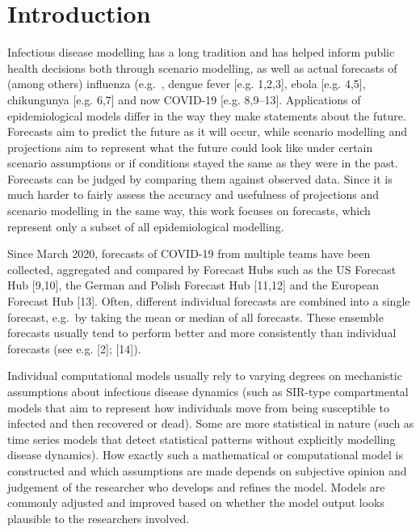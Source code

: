 \documentclass[10pt,letterpaper]{article}
\begin{document}
\linenumbers

\hypertarget{introduction}{%
\section{Introduction}\label{introduction}}

Infectious disease modelling has a long tradition and has helped inform
public health decisions both through scenario modelling, as well as
actual forecasts of (among others) influenza
(e.g.~\cite{mcgowanCollaborativeEffortsForecast2019, reichCollaborativeMultiyearMultimodel2019,  shamanForecastingSeasonalOutbreaks2012, biggerstaffResultsCentersDisease2016},
dengue fever {[}e.g. 1,2,3{]}, ebola {[}e.g. 4,5{]}, chikungunya {[}e.g.
6,7{]} and now COVID-19 {[}e.g. 8,9--13{]}. Applications of
epidemiological models differ in the way they make statements about the
future. Forecasts aim to predict the future as it will occur, while
scenario modelling and projections aim to represent what the future
could look like under certain scenario assumptions or if conditions
stayed the same as they were in the past. Forecasts can be judged by
comparing them against observed data. Since it is much harder to fairly
assess the accuracy and usefulness of projections and scenario modelling
in the same way, this work focuses on forecasts, which represent only a
subset of all epidemiological modelling.

Since March 2020, forecasts of COVID-19 from multiple teams have been
collected, aggregated and compared by Forecast Hubs such as the US
Forecast Hub {[}9,10{]}, the German and Polish Forecast Hub {[}11,12{]}
and the European Forecast Hub {[}13{]}. Often, different individual
forecasts are combined into a single forecast, e.g.~by taking the mean
or median of all forecasts. These ensemble forecasts usually tend to
perform better and more consistently than individual forecasts (see e.g.
{[}2{]}; {[}14{]}).

Individual computational models usually rely to varying degrees on
mechanistic assumptions about infectious disease dynamics (such as
SIR-type compartmental models that aim to represent how individuals move
from being susceptible to infected and then recovered or dead). Some are
more statistical in nature (such as time series models that detect
statistical patterns without explicitly modelling disease dynamics). How
exactly such a mathematical or computational model is constructed and
which assumptions are made depends on subjective opinion and judgement
of the researcher who develops and refines the model. Models are
commonly adjusted and improved based on whether the model output looks
plausible to the researchers involved.
\end{document}
